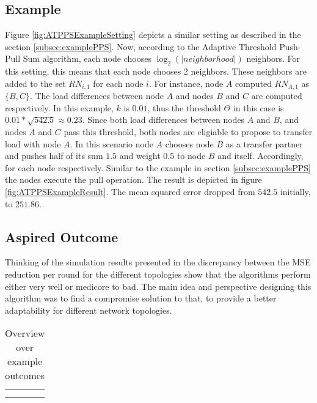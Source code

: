 \subsection{Example}\label{subsec:exampleAdaptiveThresholdPPS}
%     
Figure \ref{fig:ATPPSExampleSetting} depicts a similar setting as described in the section \ref{subsec:examplePPS}. Now, according to the Adaptive Threshold Push-Pull Sum algorithm, each node chooses $\log_{2}{(|neighborhood|)}$ neighbors. For this setting, this means that each node chooses 2 neighbors. These neighbors are added to the set $RN_{i,1}$ for each node $i$. For instance, node $A$ computed $RN_{A,1}$ as $\{B,C\}$. The load differences between node $A$ and nodes $B$ and $C$ are computed respectively. In this example, $k$ is $0.01$, thus the threshold $\Theta$ in this case is $0.01*\sqrt{542.5} \approx 0.23$. Since both load differences between nodes $A$ and $B$, and nodes $A$ and $C$ pass this threshold, both nodes are eligiable to propose to transfer load with node $A$. In this scenario node $A$ chooses node $B$ as a transfer partner and pushes half of its sum $1.5$ and weight $0.5$ to node $B$ and itself. Accordingly, for each node respectively. Similar to the example in section \ref{subsec:examplePPS} the nodes execute the pull operation. The result is depicted in figure \ref{fig:ATPPSExampleResult}. The mean squared error dropped from $542.5$ initially, to $251.86$.
%     
\subsection{Aspired Outcome}\label{subsec:aspiredOutcomeAdaptiveThresholdPPS}
Thinking of the simulation results presented in \cite{Bayazitoglu} the discrepancy between the MSE reduction per round for the different topologies show that the algorithms perform either very well or medicore to bad. The main idea and perspective designing this algorithm was to find a compromise solution to that, to provide a better adaptability for different network topologies.



\begin{table}[]
    \begin{tabular}{|l|l|l|}
    \hline
     &  &  \\ \hline
     &  &  \\ \hline
     &  &  \\ \hline
    \end{tabular}
    \caption{Overview over example outcomes}
    \label{tab:overviewExamples}
\end{table}